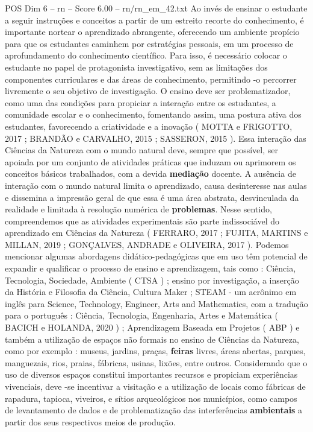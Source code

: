\begin{textsample}{POS Dim 6 – rn – Score 6.00 – rn/rn\_em\_42.txt}
Ao invés de ensinar o estudante a seguir instruções e conceitos a partir de um estreito recorte do conhecimento, é importante nortear o aprendizado abrangente, oferecendo um ambiente propício para que os estudantes caminhem por estratégias pessoais, em um processo de aprofundamento do conhecimento científico.
Para isso, é necessário colocar o estudante no papel de protagonista investigativo, sem as limitações dos componentes curriculares e das áreas de conhecimento, permitindo -o percorrer livremente o seu objetivo de investigação.
O ensino deve ser problematizador, como uma das condições para propiciar a interação entre os estudantes, a comunidade escolar e o conhecimento, fomentando assim, uma postura ativa dos estudantes, favorecendo a criatividade e a inovação ( MOTTA e FRIGOTTO, 2017 ; BRANDÃO e CARVALHO, 2015 ; SASSERON, 2015 ).
Essa interação das Ciências da Natureza com o mundo natural deve, sempre que possível, ser apoiada por um conjunto de atividades práticas que induzam ou aprimorem os conceitos básicos trabalhados, com a devida \textbf{mediação} docente.
A ausência de interação com o mundo natural limita o aprendizado, causa desinteresse nas aulas e dissemina a impressão geral de que essa é uma área abstrata, desvinculada da realidade e limitada à resolução numérica de \textbf{problemas}.
Nesse sentido, compreendemos que as atividades experimentais são parte indissociável do aprendizado em Ciências da Natureza ( FERRARO, 2017 ; FUJITA, MARTINS e MILLAN, 2019 ; GONÇALVES, ANDRADE e OLIVEIRA, 2017 ).
Podemos mencionar algumas abordagens didático-pedagógicas que em uso têm potencial de expandir e qualificar o processo de ensino e aprendizagem, tais como : Ciência, Tecnologia, Sociedade, Ambiente ( CTSA ) ; ensino por investigação, a inserção da História e Filosofia da Ciência, Cultura Maker ; STEAM - um acrônimo em inglês para Science, Technology, Engineer, Arts and Mathematics, com a tradução para o português : Ciência, Tecnologia, Engenharia, Artes e Matemática ( BACICH e HOLANDA, 2020 ) ; Aprendizagem Baseada em Projetos ( ABP ) e também a utilização de espaços não formais no ensino de Ciências da Natureza, como por exemplo : museus, jardins, praças, \textbf{feiras} livres, áreas abertas, parques, manguezais, rios, praias, fábricas, usinas, lixões, entre outros.
Considerando que o uso de diversos espaços constitui importantes recursos e propiciam experiências vivenciais, deve -se incentivar a visitação e a utilização de locais como fábricas de rapadura, tapioca, viveiros, e sítios arqueológicos nos municípios, como campos de levantamento de dados e de problematização das interferências \textbf{ambientais} a partir dos seus respectivos meios de produção.

\end{textsample}
